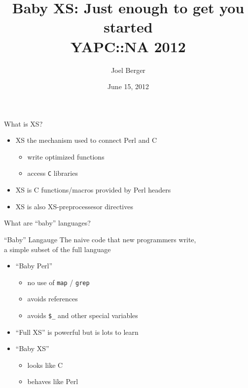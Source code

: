 \documentclass{beamer}
\title[Baby XS]{Baby XS: Just enough to get you started\\YAPC::NA 2012}
\author{Joel Berger}
\institute[UIC]{University of Illinois at Chicago}
\date{June 15, 2012}
\providecommand{\code}[1]{{\texttt{\scriptsize{#1}}}}
\begin{document}
\begin{frame}
  \maketitle
\end{frame}

\begin{frame}{What is XS?}
  \begin{itemize}
    \item XS the mechanism used to connect Perl and C
      \begin{itemize}
        \item write optimized functions
        \item access \code{C} libraries
      \end{itemize}
  \end{itemize}
  \vfill
  \vfill
  \begin{itemize}
    \item<3-> XS is C functions/macros provided by Perl headers
    \item<4-> XS is also XS-preprocessesor directives
  \end{itemize}
\end{frame}

\begin{frame}{What are ``baby'' languages?}
  \begin{block}{``Baby'' Langauge}
    The naive code that new programmers write,\\a simple subset of the full language
  \end{block}
  \begin{itemize}
    \item ``Baby Perl''
      \begin{itemize}
        \item no use of \code{map} / \code{grep}
        \item avoids references
        \item avoids \code{\$\_} and other special variables
      \end{itemize}
    \item ``Full XS'' is powerful but is lots to learn
    \item ``Baby XS'' 
     \begin{itemize}
       \item looks like C
       \item behaves like Perl
     \end{itemize}
  \end{itemize}
\end{frame}
\end{document}
